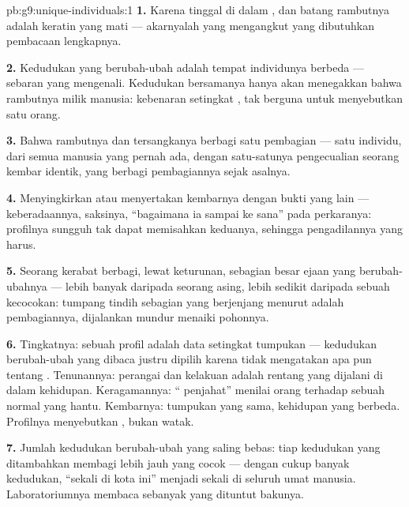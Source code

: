 \begin{solution}{pb:g9:unique-individuals:1}
\textbf{1.} Karena  tinggal di dalam , dan
batang rambutnya adalah keratin yang mati ---  akarnyalah
yang mengangkut  yang dibutuhkan pembacaan lengkapnya.

\textbf{2.} Kedudukan yang berubah-ubah adalah tempat
individunya berbeda --- sebaran yang mengenali. Kedudukan
bersamanya hanya akan menegakkan bahwa rambutnya milik
manusia: kebenaran setingkat , tak berguna untuk
menyebutkan satu orang.

\textbf{3.} Bahwa  rambutnya dan  tersangkanya berbagi
satu pembagian --- satu individu, dari semua manusia yang
pernah ada, dengan satu-satunya pengecualian seorang kembar
identik, yang berbagi pembagiannya sejak asalnya.

\textbf{4.} Menyingkirkan atau menyertakan kembarnya dengan
bukti yang lain --- keberadaannya, saksinya, ``bagaimana ia
sampai ke sana'' pada perkaranya: profilnya sungguh tak dapat
memisahkan keduanya, sehingga pengadilannya yang harus.

\textbf{5.} Seorang kerabat berbagi, lewat keturunan,
sebagian besar ejaan yang berubah-ubahnya --- lebih banyak
daripada seorang asing, lebih sedikit daripada sebuah
kecocokan: tumpang tindih sebagian yang berjenjang menurut
 adalah pembagiannya, dijalankan mundur menaiki
pohonnya.

\textbf{6.} Tingkatnya: sebuah profil adalah data setingkat
tumpukan --- kedudukan berubah-ubah yang dibaca justru
dipilih karena tidak mengatakan apa pun tentang .
Tenunannya: perangai dan kelakuan adalah rentang yang
dijalani di dalam kehidupan. Keragamannya: `` penjahat''
menilai orang terhadap sebuah normal yang hantu. Kembarnya:
tumpukan yang sama, kehidupan yang berbeda. Profilnya
menyebutkan , bukan watak.

\textbf{7.} Jumlah kedudukan berubah-ubah yang saling bebas:
tiap kedudukan yang ditambahkan membagi lebih jauh 
yang cocok --- dengan cukup banyak kedudukan, ``sekali di
kota ini'' menjadi sekali di seluruh umat manusia.
Laboratoriumnya membaca sebanyak yang dituntut bakunya.


\end{solution}
